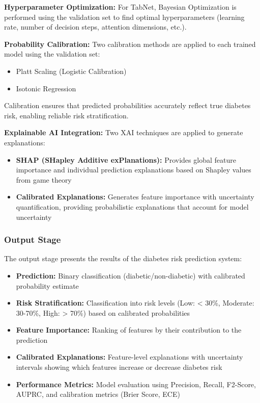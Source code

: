 \textbf{Hyperparameter Optimization:} For TabNet, Bayesian Optimization is performed using the validation set to find optimal hyperparameters (learning rate, number of decision steps, attention dimensions, etc.).

\textbf{Probability Calibration:} Two calibration methods are applied to each trained model using the validation set:
\begin{itemize}
    \item Platt Scaling (Logistic Calibration)
    \item Isotonic Regression
\end{itemize}

Calibration ensures that predicted probabilities accurately reflect true diabetes risk, enabling reliable risk stratification.

\textbf{Explainable AI Integration:} Two XAI techniques are applied to generate explanations:
\begin{itemize}
    \item \textbf{SHAP (SHapley Additive exPlanations):} Provides global feature importance and individual prediction explanations based on Shapley values from game theory
    \item \textbf{Calibrated Explanations:} Generates feature importance with uncertainty quantification, providing probabilistic explanations that account for model uncertainty
\end{itemize}

\subsubsection{Output Stage}

The output stage presents the results of the diabetes risk prediction system:

\begin{itemize}
    \item \textbf{Prediction:} Binary classification (diabetic/non-diabetic) with calibrated probability estimate
    \item \textbf{Risk Stratification:} Classification into risk levels (Low: < 30\%, Moderate: 30-70\%, High: > 70\%) based on calibrated probabilities
    \item \textbf{Feature Importance:} Ranking of features by their contribution to the prediction
    \item \textbf{Calibrated Explanations:} Feature-level explanations with uncertainty intervals showing which features increase or decrease diabetes risk
    \item \textbf{Performance Metrics:} Model evaluation using Precision, Recall, F2-Score, AUPRC, and calibration metrics (Brier Score, ECE)
\end{itemize}

